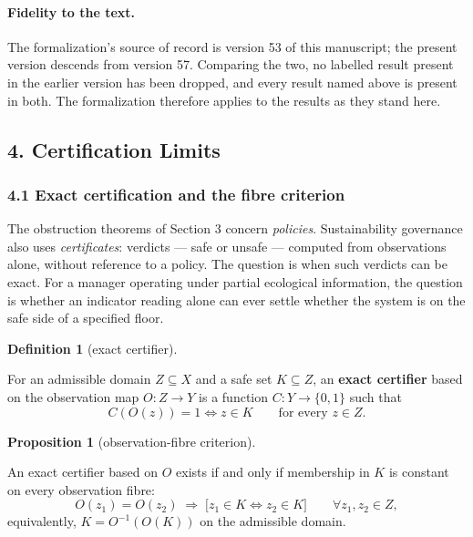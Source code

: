 \documentclass[10pt,twocolumn]{article}
\theoremstyle{definition}
\newtheorem{proposition}{Proposition}
\newtheorem{definition}{Definition}
\begin{document}
\paragraph{Fidelity to the text.} The formalization's source of record is version 53 of
this manuscript; the present version descends from version 57. Comparing the two, no
labelled result present in the earlier version has been dropped, and every result named
above is present in both. The formalization therefore applies to the results as they
stand here.

\subsection{4. Certification Limits}\label{calc-certification-limits}

\subsubsection{4.1 Exact certification and the fibre
criterion}\label{calc-exact-certification-and-the-fibre-criterion}

The obstruction theorems of Section 3 concern \emph{policies}.
Sustainability governance also uses \emph{certificates}: verdicts
--- safe or unsafe --- computed from observations alone, without
reference to a policy. The question is when such verdicts can be exact.
For a manager operating under partial ecological information, the question is whether an indicator reading alone can ever settle whether the system is on the safe side of a specified floor.

\begin{definition}[exact certifier]\label{calc-def:certifier}

For an admissible domain
\(Z \subseteq X\) and a safe set \(K \subseteq Z\), an \textbf{exact
certifier} based on the observation map \(O : Z \to Y\) is a function
\(C : Y \to \{0,1\}\) such that
\[C(O(z)) = 1 \iff z \in K \qquad \text{for every } z \in Z.\]

\end{definition}

\begin{proposition}[observation-fibre criterion]\label{calc-prop:fibre}

An exact certifier
based on \(O\) exists if and only if membership in \(K\) is constant on
every observation fibre:
\[O(z_1) = O(z_2) \;\Longrightarrow\; \big[ z_1 \in K \iff z_2 \in K \big] \qquad \forall z_1, z_2 \in Z, \tag{5}\]
equivalently, \(K = O^{-1}(O(K))\) on the admissible domain.

\end{proposition}
\end{document}
